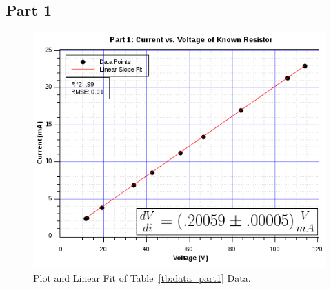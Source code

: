 \documentclass[twocolumn,english]{IEEEtran}
\theoremstyle{plain}
\theoremstyle{plain}
\begin{document}
\subsection*{Part 1}
  \begin{figure}[H]
  \begin{centering}
  \begin{center}
  \includegraphics[width=\linewidth]{./part1graph.png}
  \caption{Plot and Linear Fit of Table~\ref{tb:data_part1} Data.}
  \label{fig:graph_part1}
  \end{center}
  \par\end{centering}
  \end{figure}
\end{document}
